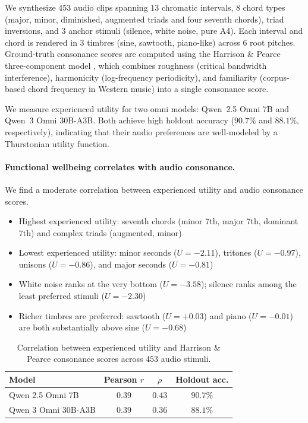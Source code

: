 We synthesize $453$ audio clips spanning $13$ chromatic intervals, $8$ chord types (major, minor, diminished, augmented triads and four seventh chords), triad inversions, and $3$ anchor stimuli (silence, white noise, pure A4). Each interval and chord is rendered in $3$ timbres (sine, sawtooth, piano-like) across $6$ root pitches. Ground-truth consonance scores are computed using the Harrison \& Pearce three-component model \citep{harrison2020consonance}, which combines roughness (critical bandwidth interference), harmonicity (log-frequency periodicity), and familiarity (corpus-based chord frequency in Western music) into a single consonance score.

We measure experienced utility for two omni models: Qwen~2.5 Omni 7B and Qwen~3 Omni 30B-A3B. Both achieve high holdout accuracy ($90.7\%$ and $88.1\%$, respectively), indicating that their audio preferences are well-modeled by a Thurstonian utility function.

\paragraph{Functional wellbeing correlates with audio consonance.}

We find a moderate correlation between experienced utility and audio consonance scores.

\begin{itemize}
    \item Highest experienced utility: seventh chords (minor 7th, major 7th, dominant 7th) and complex triads (augmented, minor)
    \item Lowest experienced utility: minor seconds ($U = -2.11$), tritones ($U = -0.97$), unisons ($U = -0.86$), and major seconds ($U = -0.81$)
    \item White noise ranks at the very bottom ($U = -3.58$); silence ranks among the least preferred stimuli ($U = -2.30$)
    \item Richer timbres are preferred: sawtooth ($U = +0.03$) and piano ($U = -0.01$) are both substantially above sine ($U = -0.68$)
\end{itemize}

\begin{table}[h]
\centering
\small
\caption{Correlation between experienced utility and Harrison \& Pearce consonance scores across $453$ audio stimuli.}
\label{tab:consonance-corr}
\begin{tabular}{@{}lccc@{}}
\toprule
Model & Pearson $r$ & $\rho$ & Holdout acc. \\
\midrule
Qwen 2.5 Omni 7B  & $0.39$ & $0.43$ & $90.7\%$ \\
Qwen 3 Omni 30B-A3B   & $0.39$ & $0.36$ & $88.1\%$ \\
\bottomrule
\end{tabular}
\end{table}

